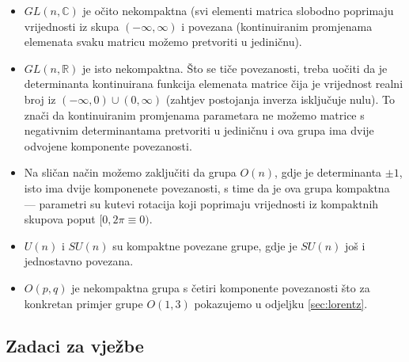 \begin{itemize}
\item $GL(n, \mathbb{C})$ je očito nekompaktna (svi elementi matrica
slobodno poprimaju vrijednosti iz skupa $(-\infty, \infty)$ i povezana
(kontinuiranim promjenama elemenata svaku matricu možemo pretvoriti u
jediničnu).

\item $GL(n, \mathbb{R})$ je isto nekompaktna. Što se tiče povezanosti,
treba uočiti da je determinanta kontinuirana funkcija elemenata matrice
čija je vrijednost realni broj iz $(-\infty, 0) \cup (0, \infty)$
(zahtjev postojanja inverza isključuje nulu). To znači da kontinuiranim
promjenama parametara ne možemo matrice s negativnim determinantama
pretvoriti u jediničnu i ova grupa ima dvije odvojene komponente povezanosti.

\item Na sličan način možemo zaključiti da grupa $O(n)$, gdje je
determinanta $\pm 1$, isto ima dvije komponenete povezanosti, s time
da je ova grupa kompaktna --- parametri su kutevi rotacija koji poprimaju
vrijednosti iz kompaktnih skupova poput $[0, 2\pi\equiv0)$.

\item $U(n)$ i $SU(n)$ su kompaktne povezane grupe, gdje je $SU(n)$ još i
jednostavno povezana.

\item $O(p, q)$ je nekompaktna grupa s četiri komponente povezanosti
što za konkretan primjer grupe $O(1,3)$ pokazujemo u odjeljku \ref{sec:lorentz}.

\end{itemize}

\subsection*{Zadaci za vježbe}


